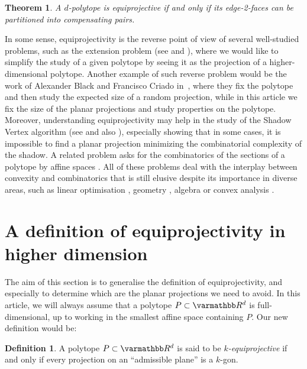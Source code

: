 \documentclass[12pt, notitlepage]{article}
\renewcommand{\mathbb}{\varmathbb}
\theoremstyle{plain}
\newtheorem{thm}{Theorem}[section]
\theoremstyle{definition}
\newtheorem{defin}{Definition}
\theoremstyle{plain}
\theoremstyle{remark}
\theoremstyle{plain}
\theoremstyle{plain}
\newcommand{\R}{\mathbb R}
\begin{document}
\begin{thm}
    \label{charact}
    A $d$-polytope is equiprojective if and only if its edge-2-faces can be partitioned into compensating pairs.
\end{thm}

In some sense, equiprojectivity is the reverse point of view of several well-studied problems, such as the extension problem (see \cite{Exp_Low} and \cite{TR}), where we would like to simplify the study of a given polytope by seeing it as the projection of a higher-dimensional polytope. Another example of such reverse problem would be the work of Alexander Black and Francisco Criado in~\cite{Black}, where they fix the polytope and then study the expected size of a random projection, while in this article we fix the size of the planar projections and study properties on the polytope. Moreover, understanding equiprojectivity may help in the study of the Shadow Vertex algorithm (see \cite{DDSH} and also \cite{DDNH}), especially showing that in some cases, it is impossible to find a planar projection minimizing the combinatorial complexity of the shadow. A related problem asks for the combinatorics of the sections of a polytope by affine spaces \cite{affine_1, affine_2, affine_3, affine_4}. All of these problems deal with the interplay between convexity and combinatorics that is still elusive despite its importance in diverse areas, such as linear optimisation \cite{lin_op_3, lin_op_2, lin_op_1, lin_op_4, lien_1, lien_2}, geometry \cite{moser, SHEPH, SHEPH2, lien_3}, algebra \cite{affine_1, alg} or convex analysis \cite{conv_an, affine_4}.

\section{A definition of equiprojectivity in higher dimension}

The aim of this section is to generalise the definition of equiprojectivity, and especially to determine which are the planar projections we need to avoid. In this article, we will always assume that a polytope $P\subset \R^d$ is full-dimensional, up to working in the smallest affine space containing $P$. Our new definition would be:

\begin{defin}
    \label{new_def}
    A polytope $P\subset \R^d$ is said to be \emph{$k$-equiprojective} if and only if every projection on an “admissible plane” is a $k$-gon.
\end{defin}
\end{document}
